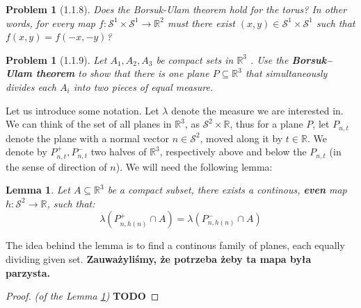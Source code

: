 \documentclass[11pt, a4paper, final]{amsart}
\newcommand{\R}{{\mathbb{R}}}
\newcommand\todo[1]{\textbf{\textcolor{redd}{#1}}}
\newcommand{\sphere}{\mathcal{S}}
\numberwithin{theorem}{section}
\newtheorem{lemma}[theorem]{Lemma}
\newtheorem{problem}[theorem]{Problem}
\theoremstyle{definition}
\theoremstyle{remark}
\begin{document}
\begin{problem}[1.1.8]\label{problem: 1.1.8}
    Does the Borsuk-Ulam theorem hold for the torus? In other words, for every map
    $f: \sphere^1 \times \sphere^1 \to \R^2$ must there exist $(x,y) \in \sphere^1 \times \sphere^1$ such that 
    $f(x,y)= f(-x,-y)$?
\end{problem}

\begin{problem}[1.1.9]\label{problem: 1.1.9}
    Let $A_1 , A_2 , A_3$ be compact sets in $\R^3$ . Use the \textbf{Borsuk–Ulam theorem} to show
that there is one plane $P \subseteq \R^3$ that simultaneously divides each $A_i$ into two pieces of
equal measure.
\end{problem}

Let us introduce some notation. Let $\lambda$ denote the measure we are interested in. We can think of the set of all planes in $\R^3$, as $\sphere^2\times\R$, thus for a plane $P$, let $P_{n, t}$ denote the plane with a normal vector $n \in \mathcal{S}^2$, moved along it by $t \in \R$. We denote by $P^+_{n, t}, P^-_{n, t}$ two halves of $\R^3$, respectively above and below the $P_{n, t}$ (in the sense of direction of $n$). We will need the following lemma:

\begin{lemma}\label{lemma: about continous equal-cutting}
    Let $A \subseteq \R^3$ be a compact subset, there exists a continous, \textbf{even} map $h : \sphere^2 \xrightarrow{} \R$, such that:
    $$\lambda(P^+_{n, h(n)} \cap A) = \lambda(P^-_{n, h(n)} \cap A)$$
\end{lemma}

The idea behind the lemma is to find a continous family of planes, each equally dividing given set.
\todo{Zauważyliśmy, że potrzeba żeby ta mapa była parzysta.}

\begin{proof}\textit{(of the Lemma \ref{lemma: about continous equal-cutting})}
    \todo{TODO}
\end{proof}
\end{document}
